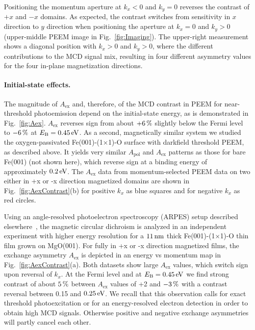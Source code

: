\documentclass[prl,twocolumn,floatfix,superscriptaddress]{revtex4-2}
\begin{document}
Positioning the momentum aperture at $k_x < 0$ and $k_y = 0$ reverses the contrast of $+x$ and $-x$ domains. As expected, the contrast switches from sensitivity in $x$ direction to $y$ direction when positioning the aperture at $k_x = 0$ and $k_y > 0$ (upper-middle PEEM image in Fig.~\ref{fig:Imaging}). The upper-right measurement shows a diagonal position with $k_x > 0$ and $k_y > 0$, where the different contributions to the MCD signal mix, resulting in four different asymmetry values for the four in-plane magnetization directions. 

\paragraph{Initial-state effects.} The magnitude of $A_{\mathrm{ex}}$ and, therefore, of the MCD contrast in PEEM for near-threshold photoemission depend on the initial-state energy, as is demonstrated in Fig.~\ref{fig:Aex}. $A_{\mathrm{ex}}$ reverses sign from about $\unit[+6]{\%}$ slightly below the Fermi level to $\unit[-6]{\%}$ at $E_{\mathrm{B}} = \unit[0.45]{eV}$. 
As a second, magnetically similar system we studied the oxygen-passivated Fe(001)-(1$\times$1)-O surface with darkfield threshold PEEM, as described above. It yields very similar $A_{\mathrm{pol}}$ and $A_{\mathrm{ex}}$ patterns as those for bare Fe(001) (not shown here), which reverse sign at a binding energy of approximately $\unit[0.2]{eV}$. The $A_{\mathrm{ex}}$ data from momentum-selected PEEM data on two either in +x or -x direction magnetized domains are shown in Fig.~\ref{fig:AexContrast}(b) for positive $k_x$ as blue squares and for negative $k_x$ as red circles. 

Using an angle-resolved photoelectron spectroscopy (ARPES) setup described elsewhere~\cite{gillmeister2018, gillmeister2020}, the magnetic circular dichroism is analyzed in an independent experiment with higher energy resolution for a $\unit[11]{nm}$ thick Fe(001)-(1$\times$1)-O thin film grown on MgO(001). For fully in +x or -x direction magnetized films, the exchange asymmetry $A_{\mathrm{ex}}$ is depicted in an energy vs momentum map in Fig.~\ref{fig:AexContrast}(a). Both datasets show large $A_{\mathrm{ex}}$ values, which switch sign upon reversal of $k_x$. At the Fermi level and at $E_{\mathrm{B}} = \unit[0.45]{eV}$ we find strong contrast of about $\unit[5]{\%}$ between $A_{\mathrm{ex}}$ values of +2 and $\unit[-3]{\%}$ with a contrast reversal between 0.15 and $\unit[0.25]{eV}$. We recall that this observation calls for exact threshold photoexcitation or for an energy-resolved electron detection in order to obtain high MCD signals. Otherwise positive and negative exchange asymmetries will partly cancel each other.
\end{document}
